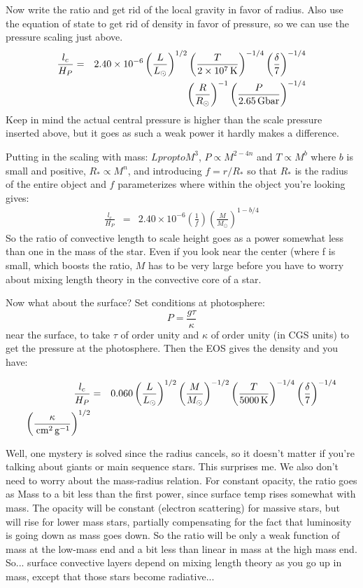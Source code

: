 \documentclass{emulateapj}
\newcommand{\scale}[2]{\left(\frac{#1}{#2}\right)}
\newcommand{\unit}[1]{\,\hbox{#1}}
\begin{document}
Now write the ratio and get rid of the local gravity in favor of
radius.  Also use the equation of state to get rid of density in favor
of pressure, so we can use the pressure scaling just above.  
\begin{eqnarray}  
\frac{l_c}{H_P} 
  & = & 2.40 \times 10^{-6}
  \scale{L}{L_\odot}^{1/2}
  \scale{T}{2 \times 10^7 \unit{K}}^{-1/4}
  \scale{\delta}{7}^{-1/4}  \\
  & & \scale{R}{R_\odot}^{-1}
  \scale{P}{2.65 \unit{Gbar}}^{-1/4}
\end{eqnarray}
Keep in mind the actual central pressure is higher than the scale
pressure inserted above, but it goes as such a weak power it hardly
makes a difference.

Putting in the scaling with mass: $L propto M^3$, $P\propto M^{2-4n}$
and $T\propto M^b$ where $b$ is small and positive, $R_*\propto M^n$,
and introducing $f = r/R_*$ so that $R_*$ is the radius of the entire
object and $f$ parameterizes where within the object you're looking
gives:
\begin{eqnarray}  
\frac{l_c}{H_P} 
  & = & 2.40 \times 10^{-6}
  \scale{1}{f}
  \scale{M}{M_\odot}^{1-b/4}
\end{eqnarray}
So the ratio of convective length to scale height goes as a power
somewhat less than one in the mass of the star.  Even if you look near
the center (where f is small, which boosts the ratio, $M$ has to be
very large before you have to worry about mixing length theory in the
convective core of a star.

Now what about the surface?  Set conditions at photosphere:
\begin{equation}
  P = \frac{g \tau}{\kappa}
\end{equation}
near the surface, to take $\tau$ of order unity and $\kappa$ of order
unity (in CGS units) to get the pressure at the photosphere.  Then the
EOS gives the density and you have:

\begin{eqnarray}
\frac{l_c}{H_P} 
  & = & 0.060 
  \scale{L}{L_\odot}^{1/2}
  \scale{M}{M_\odot}^{-1/2}
  \scale{T}{5000 \unit{K}}^{-1/4}
  \scale{\delta}{7}^{-1/4}  \\
  \scale{\kappa}{\unit{cm}^2\unit{g}^{-1}}^{1/2}
\end{eqnarray}

Well, one mystery is solved since the radius cancels, so it doesn't
matter if you're talking about giants or main sequence stars.  This
surprises me.  We also don't need to worry about the mass-radius
relation.  For constant opacity, the ratio goes as Mass to a bit less
than the first power, since surface temp rises somewhat with mass.
The opacity will be constant (electron scattering) for massive stars,
but will rise for lower mass stars, partially compensating for the
fact that luminosity is going down as mass goes down.  So the ratio
will be only a weak function of mass at the low-mass end and a bit
less than linear in mass at the high mass end.  So... surface
convective layers depend on mixing length theory as you go up in mass,
except that those stars become radiative...
\end{document}
